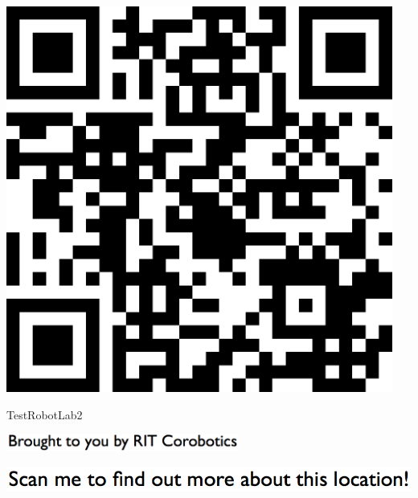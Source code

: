 \documentclass[letterpaper]{article}
\begin{document}
 \begingroup 
 \centerline{\includegraphics[scale=1,width=5in,height=5in]{TestRobotLab2.png}} 
 \endgroup 
 \vspace*{\fill} 

 \hfill{\small TestRobotLab2} 

  \vspace{0.7in} 
 
 \centerline{\includegraphics[scale=1,width=3in]{text-bottom.png}} 
 
 \pagebreak 
{} 
 \vspace*{\fill} 
 
  \centerline{\includegraphics[scale=1,width=6in]{text-top.png}} 
 
 \vspace{0.5in} 
 
\end{document}
